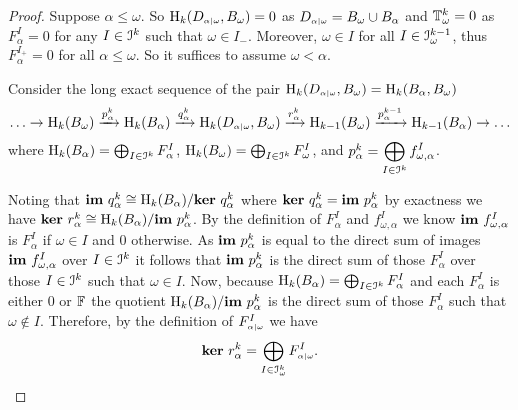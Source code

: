 \begin{proof}
  Suppose $\alpha\leq\omega$.
  So $\mathrm{H}_k(D_{\scriptscriptstyle \alpha\mid \omega}, B_\omega) = 0$ as $D_{\scriptscriptstyle \alpha\mid \omega} = B_\omega\cup B_\alpha$ and $\mathbb{T}^k_\omega = 0$ as $F_\alpha^I = 0$ for any $I\in \mathcal{I}^k$ such that $\omega\in I_-$.
  Moreover, $\omega\in I$ for all $I\in \mathcal{I}_\omega^{k-1}$, thus $F_\alpha^{I_+} = 0$ for all $\alpha\leq\omega$.
  So it suffices to assume $\omega < \alpha$.

  Consider the long exact sequence of the pair $\mathrm{H}_k(D_{\scriptscriptstyle \alpha\mid \omega}, B_\omega) = \mathrm{H}_k(B_\alpha, B_\omega)$
  \[ \ldots\to \mathrm{H}_k(B_\omega)\xrightarrow{p_\alpha^k} \mathrm{H}_k(B_\alpha)\xrightarrow{q_\alpha^k}\mathrm{H}_k(D_{\scriptscriptstyle \alpha\mid \omega}, B_\omega)\xrightarrow{r_\alpha^k} \mathrm{H}_{k-1}(B_\omega)\xrightarrow{p_\alpha^{k-1}}\mathrm{H}_{k-1}(B_\alpha)\to\ldots\]
  where $\mathrm{H}_k(B_\alpha) = \bigoplus_{I\in \mathcal{I}^k}F_\alpha^I$, $\mathrm{H}_k(B_\omega) = \bigoplus_{I\in \mathcal{I}^k}F_\omega^I$, and $p_\alpha^k = \displaystyle\bigoplus_{I\in\mathcal{I}^k} f_{\omega,\alpha}^I$.

  Noting that $\mathbf{im}~q_\alpha^k \cong \mathrm{H}_k(B_\alpha) / \mathbf{ker}~q_\alpha^k$ where $\mathbf{ker}~q_\alpha^k = \mathbf{im}~p_\alpha^k$ by exactness we have $\mathbf{ker}~r_\alpha^k \cong \mathrm{H}_k(B_\alpha) / \mathbf{im}~p_\alpha^k$.
  By the definition of $F_\alpha^I$ and $f_{\omega,\alpha}^I$ we know $\mathbf{im}~f_{\omega,\alpha}^I$ is $F_\alpha^I$ if $\omega\in I$ and 0 otherwise.
  As $\mathbf{im}~p_\alpha^k$ is equal to the direct sum of images $\mathbf{im}~f_{\omega,\alpha}^I$ over $I\in\mathcal{I}^k$ it follows that $\mathbf{im}~p_\alpha^k$ is the direct sum of those $F_\alpha^I$ over those $I\in\mathcal{I}^k$ such that $\omega\in I$.
  Now, because $\mathrm{H}_k(B_\alpha) = \bigoplus_{I\in \mathcal{I}^k}F_\alpha^I$ and each $F_\alpha^I$ is either 0 or $\mathbb{F}$ the quotient $\mathrm{H}_k(B_\alpha) / \mathbf{im}~p_\alpha^k$ is the direct sum of those $F_\alpha^I$ such that $\omega\notin I$.
  Therefore, by the definition of $F_{\scriptscriptstyle \alpha\mid \omega}^I$ we have
  \[ \mathbf{ker}~r_\alpha^k = \bigoplus_{I\in\mathcal{I}_\omega^k} F_{\scriptscriptstyle \alpha\mid \omega}^I.\]


\end{proof}

